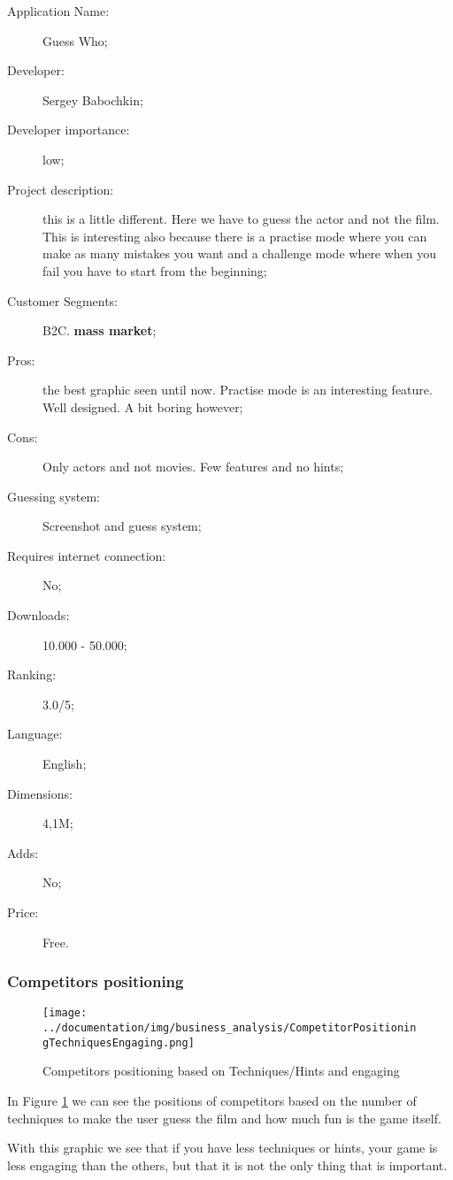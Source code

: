 \begin{description}
\item[Application Name:] Guess Who;
\item[Developer:] Sergey Babochkin;
\item[Developer importance:] low;
\item[Project description:] this is a little different. Here we have to guess the actor and not the film. This is interesting also because there is a practise mode where you can make as many mistakes you want and a challenge mode where when you fail you have to start from the beginning;
\item[Customer Segments:] B2C. \textbf{mass market};
\item[Pros:] the best graphic seen until now. Practise mode is an interesting feature. Well designed. A bit boring however;
\item[Cons:] Only actors and not movies. Few features and no hints;
\item[Guessing system:] Screenshot and guess system;
\item[Requires internet connection:] No;
\item[Downloads:] 10.000 - 50.000;
\item[Ranking:] 3.0/5;
\item[Language:] English;
\item[Dimensions:] 4,1M;
\item[Adds:] No;
\item[Price:] Free.
\end{description}

\subsubsection{Competitors positioning}
\begin{figure}[H]
\centering %
\texttt{[image: ../documentation/img/business\_analysis/CompetitorPositioningTechniquesEngaging.png]}
\caption{Competitors positioning based on Techniques/Hints and engaging}
\label{fig:competitorsPositioningTechAndEngaging}
\end{figure}

In Figure \ref{fig:competitorsPositioningTechAndEngaging} we can see the positions of competitors based on the number of techniques to make the user guess the film and how much fun is the game itself.

With this graphic we see that if you have less techniques or hints, your game is less engaging than the others, but that it is not the only thing that is important.

